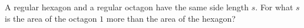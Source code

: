 A regular hexagon and a regular octagon have the same side length $s$. For what $s$ is the area of the octagon $1$ more than the area of the hexagon?
